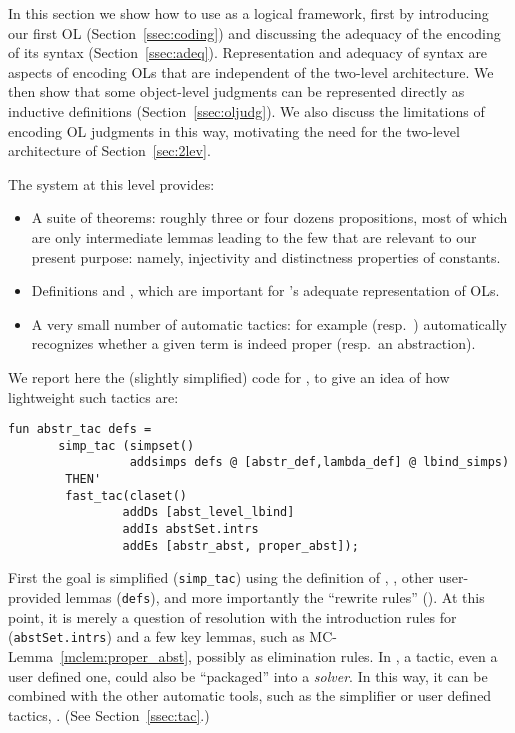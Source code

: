 \documentclass[final]{svjour3}
\begin{document}
  


In this section we show how to use \hybrid as a logical framework,
first by introducing our first OL (Section~\ref{ssec:coding}) and
discussing the adequacy of the encoding of its syntax
(Section~\ref{ssec:adeq}).  Representation and adequacy of syntax are
aspects of encoding OLs that are independent of the two-level
architecture.  We then show that some object-level judgments can be
represented directly as inductive definitions
(Section~\ref{ssec:oljudg}).  We also discuss the limitations of
encoding OL judgments in this way, motivating the need for the
two-level architecture of Section~\ref{sec:2lev}.


The system at this level provides:
\begin{itemize}
\item A suite of theorems: roughly three or four dozens propositions,
  most of which are only intermediate lemmas leading to the few that are
  relevant to our present purpose: namely, injectivity and
  distinctness properties of \hybrid constants.

\item Definitions  and , which are important for
\hybrid's adequate representation of OLs.

\item A very small number of automatic tactics: for example 
  (resp.\ ) automatically recognizes whether a given
  term is indeed proper (resp.~an abstraction).

\end{itemize}

We report here the (slightly simplified) code for ,
to give an idea of how lightweight such tactics are:

\begin{verbatim}
fun abstr_tac defs =
       simp_tac (simpset()
                 addsimps defs @ [abstr_def,lambda_def] @ lbind_simps)
        THEN'
        fast_tac(claset()
                addDs [abst_level_lbind]
                addIs abstSet.intrs
                addEs [abstr_abst, proper_abst]);
\end{verbatim}
First
the goal is simplified (\texttt{simp\_tac}) using the definition of
, , other user-provided lemmas (\texttt{defs}),
and more importantly the  ``rewrite rules''
(). At this point, it is merely a question of
resolution with the introduction rules for 
(\texttt{abstSet.intrs}) and a few key lemmas, such as
MC-Lemma~\ref{mclem:proper_abst}, possibly as elimination rules. In
, a tactic, even a user 
defined one, could also be ``packaged'' into a \emph{solver}. In this
way, it can be combined with the other automatic tools, such as the
simplifier or user defined tactics, \viz  {}.  (See
Section~\ref{ssec:tac}.)
\end{document}
